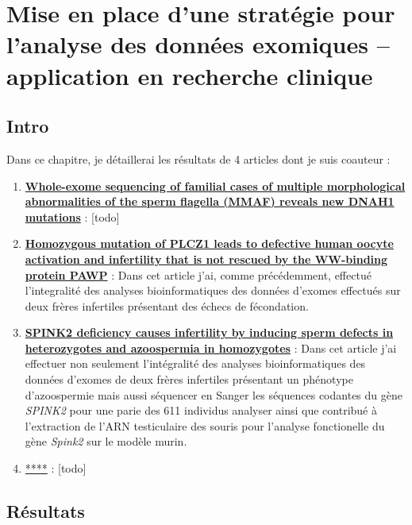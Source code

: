 \documentclass[12pt,twoside]{reedthesis}
\providecommand{\tightlist}{%
  \setlength{\itemsep}{0pt}\setlength{\parskip}{0pt}}
\theoremstyle{definition}
\theoremstyle{definition}
\theoremstyle{remark}
\begin{document}
  \chapter{Mise en place d'une stratégie pour l'analyse des données
  exomiques -- application en recherche
  clinique}\label{mise-en-place-dune-strategie-pour-lanalyse-des-donnees-exomiques-application-en-recherche-clinique}
  
  \section{Intro}\label{intro}
  
  Dans ce chapitre, je détaillerai les résultats de 4 articles dont je
  suis coauteur :
  
  \begin{enumerate}
  \def\labelenumi{\arabic{enumi}.}
  \tightlist
  \item
    \protect\hyperlink{famdnah1}{\textbf{Whole-exome sequencing of
    familial cases of multiple morphological abnormalities of the sperm
    flagella (MMAF) reveals new DNAH1 mutations}} : {[}todo{]}
  \item
    \protect\hyperlink{plcz}{\textbf{Homozygous mutation of PLCZ1 leads to
    defective human oocyte activation and infertility that is not rescued
    by the WW-binding protein PAWP}} : Dans cet article j'ai, comme
    précédemment, effectué l'integralité des analyses bioinformatiques des
    données d'exomes effectués sur deux frères infertiles présentant des
    échecs de fécondation.\\
  \item
    \protect\hyperlink{spink2}{\textbf{SPINK2 deficiency causes
    infertility by inducing sperm defects in heterozygotes and azoospermia
    in homozygotes}} : Dans cet article j'ai effectuer non seulement
    l'intégralité des analyses bioinformatiques des données d'exomes de
    deux frères infertiles présentant un phénotype d'azoospermie mais
    aussi séquencer en Sanger les séquences codantes du gène \emph{SPINK2}
    pour une parie des 611 individus analyser ainsi que contribué à
    l'extraction de l'ARN testiculaire des souris pour l'analyse
    fonctionelle du gène \emph{Spink2} sur le modèle murin.\\
  \item
    \protect\hyperlink{cohortemmah}{****} : {[}todo{]}
  \end{enumerate}
  
  \section{Résultats}\label{resultats-1}
  
\end{document}
